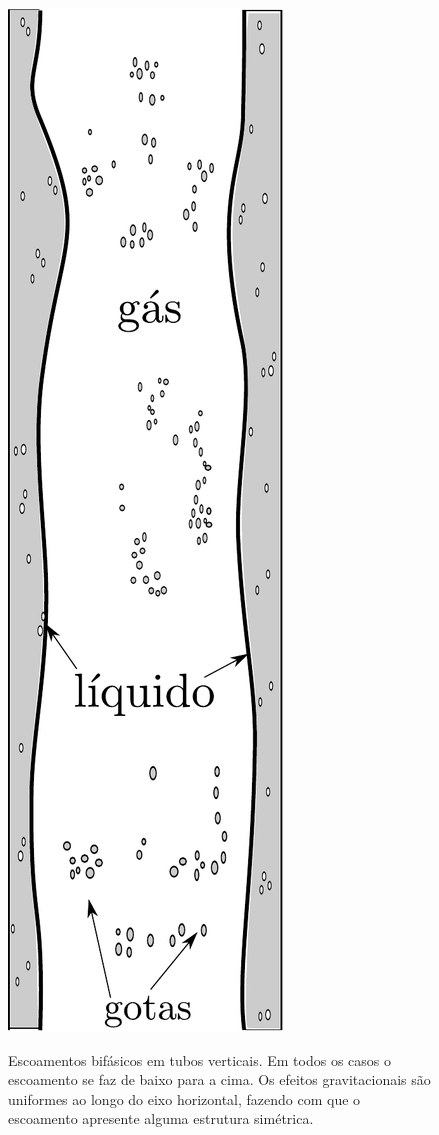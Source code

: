 \begin{figure}[h!]
\begin{center}
		{\includegraphics[angle=00, scale=0.3]{figs/v_annular.pdf}}
	\end{center}
	\caption[Escoamentos bifásicos em tubos verticais.]{Escoamentos
	bifásicos em tubos verticais. Em todos os casos o escoamento se faz
	de baixo para a cima. Os efeitos gravitacionais são uniformes ao
	longo do eixo horizontal, fazendo com que o escoamento apresente
	alguma estrutura simétrica.} \label{fig:vertical} 
\end{figure}

